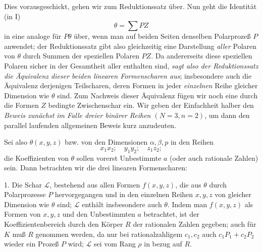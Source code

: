 Dies vorausgeschickt, gehen wir zum Reduktionssatz über. Nun geht die Identität (in I)
\[
  \theta=\sum PZ
\]
in eine analoge für $P\theta$ über, wenn man auf beiden Seiten denselben Polarprozeß $P$ anwendet; der Reduktionssatz gibt also gleichzeitig eine Darstellung \emph{aller} Polaren von $\theta$ durch Summen der speziellen Polaren $PZ$. Da andererseits diese speziellen Polaren sicher in der Gesamtheit aller enthalten sind, \emph{sagt also der Reduktionssatz die Äquivalenz dieser beiden linearen Formenscharen aus}; insbesondere auch die Äquivalenz derjenigen Teilscharen, deren Formen in jeder \emph{einzelnen} Reihe gleicher Dimension wie $\theta$ sind. Zum Nachweis dieser Äquivalenz fügen wir noch eine durch die Formen $Z$ bedingte Zwischenschar ein. Wir geben der Einfachheit halber den \emph{Beweis zunächst im Falle dreier binärer Reihen $(N=3,n=2)$}, um dann den parallel laufenden allgemeinen Beweis kurz anzudeuten.

Sei also $\theta(x,y,z)$ bzw. von den Dimensionen $\alpha,\beta,p$ in den Reihen
\[
  x_1x_2;\quad y_1y_2;\quad z_1z_2;
\]
die Koeffizienten von $\theta$ sollen vorerst Unbestimmte $a$ (oder auch rationale Zahlen) sein. Dann betrachten wir die drei linearen Formenscharen:

1. Die Schar $\mathcal L$, bestehend aus allen Formen $f(x,y,z)$, die aus $\theta$ durch Polarprozesse $P$ hervorgegangen und in den einzelnen Reihen $x,y,z$ von gleicher Dimension wie $\theta$ sind; $\mathcal L$ enthält insbesondere auch $\theta$. Indem man $f(x,y,z)$ als Formen von $x,y,z$ und den Unbestimmten $a$ betrachtet, ist der Koeffizientenbereich durch den Körper $R$ der rationalen Zahlen gegeben; auch für $K$ muß $R$ genommen werden, da nur bei rationalzahligem $c_1,c_2$ auch $c_1P_1+c_2P_2$ wieder ein Prozeß $P$ wird; $\mathcal L$ sei vom Rang $\rho$ in bezug auf $R$.

